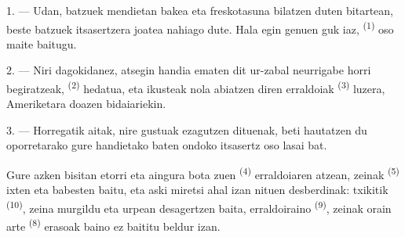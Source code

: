 %
%

\VUsaut{4.0mm}
\VUsaut{3.0mm}
\VUsaut{3.0mm}

1. --- Udan, batzuek mendietan bakea eta freskotasuna bilatzen duten bitartean,
beste batzuek itsasertzera joatea nahiago dute. Hala egin genuen guk iaz,
 \textsuperscript{(1)} oso maite baitugu.

2. --- Niri dagokidanez, atsegin handia ematen dit ur-zabal neurrigabe horri
begiratzeak,  \textsuperscript{(2)} hedatua, eta ikusteak
nola abiatzen diren  erraldoiak \textsuperscript{(3)}
 luzera, Ameriketara doazen bidaiariekin.

3. --- Horregatik aitak, nire gustuak ezagutzen dituenak, beti hautatzen du
oporretarako gure  handietako baten ondoko itsasertz oso
lasai bat.

Gure azken bisitan  etorri eta aingura bota zuen
 \textsuperscript{(4)} erraldoiaren atzean, zeinak
 \textsuperscript{(5)} ixten eta babesten baitu, eta aski
miretsi ahal izan nituen  desberdinak:
 txikitik \textsuperscript{(10)}, zeina murgildu eta urpean
desagertzen baita,  erraldoiraino \textsuperscript{(9)}, zeinak
orain arte  \textsuperscript{(8)} erasoak baino ez
baititu beldur izan.

\VUsaut{3.0mm}
\VUsaut{3.0mm}

